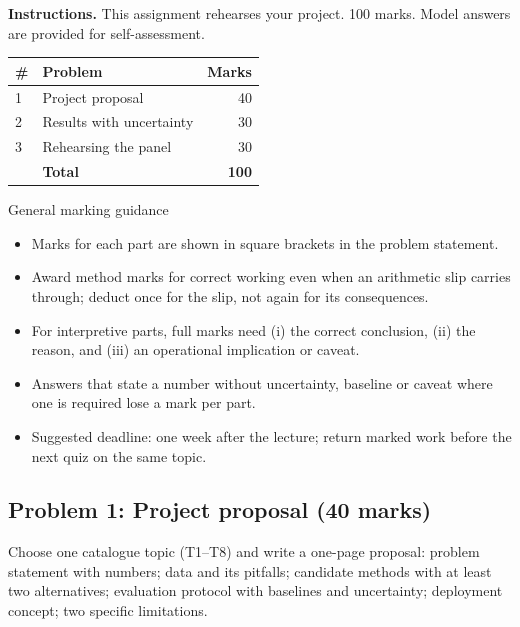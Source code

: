 \documentclass[11pt]{article}
\begin{document}
\textbf{Instructions.} This assignment rehearses your project. 100 marks. Model answers are provided for self-assessment.

\begin{center}\small\renewcommand{\arraystretch}{1.25}\begin{tabularx}{0.85\textwidth}{@{}l X r@{}}\toprule\textbf{\#} & \textbf{Problem} & \textbf{Marks}\\\midrule1 & Project proposal & 40\\
2 & Results with uncertainty & 30\\
3 & Rehearsing the panel & 30\\\midrule & \textbf{Total} & \textbf{100}\\\bottomrule\end{tabularx}\end{center}

\begin{instr}{General marking guidance}\begin{itemize}
\item Marks for each part are shown in square brackets in the problem statement.
\item Award method marks for correct working even when an arithmetic slip carries through; deduct once for the slip, not again for its consequences.
\item For interpretive parts, full marks need (i) the correct conclusion, (ii) the reason, and (iii) an operational implication or caveat.
\item Answers that state a number without uncertainty, baseline or caveat where one is required lose a mark per part.
\item Suggested deadline: one week after the lecture; return marked work before the next quiz on the same topic.
\end{itemize}\end{instr}

\subsection{Problem 1: Project proposal \normalfont\small\color{GreyN}(40 marks)}

\begin{prob}Choose one catalogue topic (T1--T8) and write a one-page proposal: problem statement with numbers; data and its pitfalls; candidate methods with at least two alternatives; evaluation protocol with baselines and uncertainty; deployment concept; two specific limitations.\end{prob}
\end{document}
